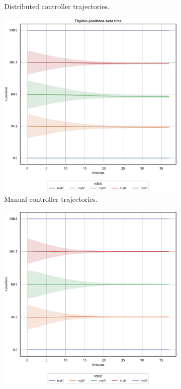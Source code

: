 \begin{figure}[H]
\begin{center}
\begin{subfigure}[h]{0.49\textwidth}
			\caption{Distributed controller trajectories.}
		\end{subfigure}
	\end{center}
	\begin{center}
		\begin{subfigure}[h]{0.49\textwidth}
			\centering			
			\includegraphics[width=.9\textwidth]{contents/images/net-d9/position-overtime-manual}%
			\caption{Manual controller trajectories.}
		\end{subfigure}
		\hfill
		\begin{subfigure}[h]{0.49\textwidth}
			\centering
			\includegraphics[width=.9\textwidth]{contents/images/net-c9/position-overtime-learned_communication}

\end{subfigure}
\end{center}
\end{figure}
